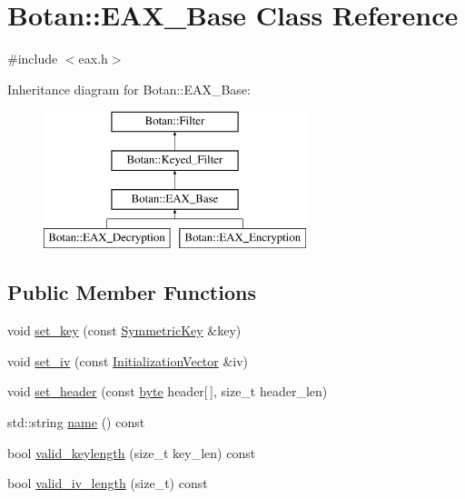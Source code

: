 \hypertarget{classBotan_1_1EAX__Base}{\section{Botan\-:\-:E\-A\-X\-\_\-\-Base Class Reference}
\label{classBotan_1_1EAX__Base}
}


{\ttfamily \#include $<$eax.\-h$>$}

Inheritance diagram for Botan\-:\-:E\-A\-X\-\_\-\-Base\-:\begin{figure}[H]
\begin{center}
\leavevmode
\includegraphics[height=4.000000cm]{classBotan_1_1EAX__Base}
\end{center}
\end{figure}
\subsection*{Public Member Functions}
\begin{DoxyCompactItemize}
\item 
void \hyperlink{classBotan_1_1EAX__Base_af2915c32db06f4b80e4b897d01605034}{set\-\_\-key} (const \hyperlink{namespaceBotan_a00c78597211d5c63b63e2a57ddb96d38}{Symmetric\-Key} \&key)
\item 
void \hyperlink{classBotan_1_1EAX__Base_ad67d53172c7044625d64101a42948077}{set\-\_\-iv} (const \hyperlink{namespaceBotan_ab6a07e859c4e3a2ccfd68308ec89497e}{Initialization\-Vector} \&iv)
\item 
void \hyperlink{classBotan_1_1EAX__Base_a8dbc6de655307828aa9e3226a6cc2c2d}{set\-\_\-header} (const \hyperlink{namespaceBotan_a7d793989d801281df48c6b19616b8b84}{byte} header\mbox{[}$\,$\mbox{]}, size\-\_\-t header\-\_\-len)
\item 
std\-::string \hyperlink{classBotan_1_1EAX__Base_a69b1b707a7cea14921e12f42989e2b9c}{name} () const 
\item 
bool \hyperlink{classBotan_1_1EAX__Base_ac1a6bd5b1a98439eca75b726ea8750fd}{valid\-\_\-keylength} (size\-\_\-t key\-\_\-len) const 
\item 
bool \hyperlink{classBotan_1_1EAX__Base_a32a7fd3b42c583cba54cad581b284b89}{valid\-\_\-iv\-\_\-length} (size\-\_\-t) const 
\end{DoxyCompactItemize}

